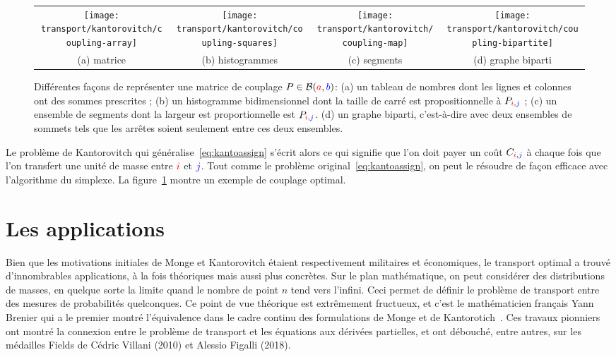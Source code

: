 \begin{figure}\centering
    \begin{tabular}{@{}c@{\hspace{1mm}}c@{\hspace{1mm}}c@{\hspace{1mm}}c@{}}
        \texttt{[image: transport/kantorovitch/coupling-array]}&
        \texttt{[image: transport/kantorovitch/coupling-squares]}&
        \texttt{[image: transport/kantorovitch/coupling-map]}&
        \texttt{[image: transport/kantorovitch/coupling-bipartite]} \\
        (a) matrice & (b) histogrammes & (c) segments & (d) graphe biparti
    \end{tabular}
    \caption{\label{fig:coupling-visu} Différentes façons de représenter une matrice de couplage $P \in \mathcal{B}({\color{red}a},{\color{blue}b})$:
    	(a) un tableau de nombres dont les lignes et colonnes ont des sommes prescrites ; 
		(b) un histogramme bidimensionnel dont la taille de carré est propositionnelle à $P_{{\color{red}i},{\color{blue}j}}$ ; 
		(c) un ensemble de segments dont la largeur est proportionnelle est  $P_{{\color{red}i},{\color{blue}j}}$. 
		(d) un graphe biparti, c'est-à-dire avec deux ensembles de sommets tels que les arrêtes soient seulement entre ces deux ensembles.   } 
\end{figure}


Le problème de Kantorovitch qui généralise~\eqref{eq:kantoassign} s'écrit alors
ce qui signifie que l'on doit payer un coût  $C_{{\color{red}i},{\color{blue}j}}$ à chaque fois que l'on transfert une unité de masse entre ${\color{red}i}$ et ${\color{blue}j}$. Tout comme le problème original~\eqref{eq:kantoassign}, on peut le résoudre de façon efficace avec l'algorithme du simplexe.  La figure~\ref{fig:coupling-visu} montre un exemple de couplage optimal. 



\section{Les applications}

Bien que les motivations initiales de Monge et Kantorovitch étaient respectivement militaires et économiques, le transport optimal a trouvé d'innombrables applications, à la fois théoriques mais aussi plus concrètes. Sur le plan mathématique, on peut considérer des distributions  de masses, en quelque sorte la limite quand le nombre de point $n$ tend vers l'infini. Ceci permet de définir le problème de transport entre des mesures de probabilités quelconques. Ce point de vue théorique est extrêmement fructueux, et c'est le mathématicien français Yann Brenier qui a le premier montré l'équivalence dans le cadre continu des formulations de Monge et de Kantorotich~\cite{Brenier91}. Ces travaux pionniers ont montré la connexion entre le problème de transport et les équations aux dérivées partielles, et ont débouché, entre autres, sur les médailles Fields de Cédric Villani (2010) et Alessio Figalli (2018). 

